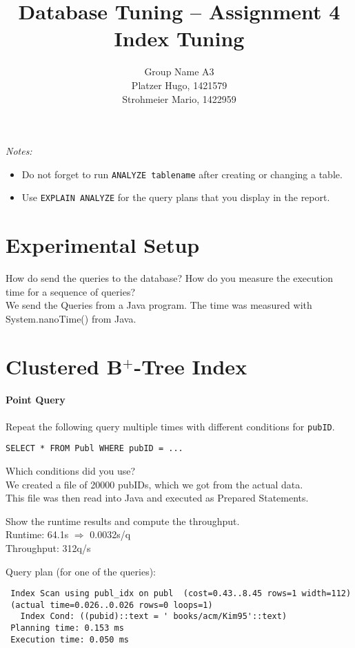 \documentclass[11pt]{scrartcl}
\title{
  \textbf{\large Database Tuning -- Assignment 4}\\
  Index Tuning
}
\author{
 Group Name A3\\
 \large Platzer Hugo, 1421579 \\
 \large Strohmeier Mario, 1422959 \\
}
\begin{document}
\maketitle

\noindent
{\it Notes:}
\begin{itemize}\itemsep=0pt
\item Do not forget to run {\tt ANALYZE tablename} after creating or
  changing a table.
\item Use {\tt EXPLAIN ANALYZE} for the query plans that you display in the report.
\end{itemize}


\section{Experimental Setup}

How do send the queries to the database? How do you measure the
execution time for a sequence of queries?\\
We send the Queries from a Java program. The time was measured with System.nanoTime() from Java.

\section{Clustered B$^+$-Tree Index}

\paragraph{Point Query}

Repeat the following query multiple times with different conditions for {\tt pubID}.

{\small
\begin{verbatim}
SELECT * FROM Publ WHERE pubID = ...
\end{verbatim}
}

\noindent
Which conditions did you use?\\
We created a file of 20000 pubIDs, which we got from the actual data.\\
This file was then read into Java and executed as Prepared Statements.

\smallskip\noindent
Show the runtime results and compute the throughput.\\
Runtime: 64.1s $\Rightarrow$ 0.0032s/q\\
Throughput: 312q/s

\smallskip\noindent
Query plan (for one of the queries):
{\small
\begin{verbatim}
 Index Scan using publ_idx on publ  (cost=0.43..8.45 rows=1 width=112)
 (actual time=0.026..0.026 rows=0 loops=1)
   Index Cond: ((pubid)::text = ' books/acm/Kim95'::text)
 Planning time: 0.153 ms
 Execution time: 0.050 ms
\end{verbatim}
}
\end{document}
